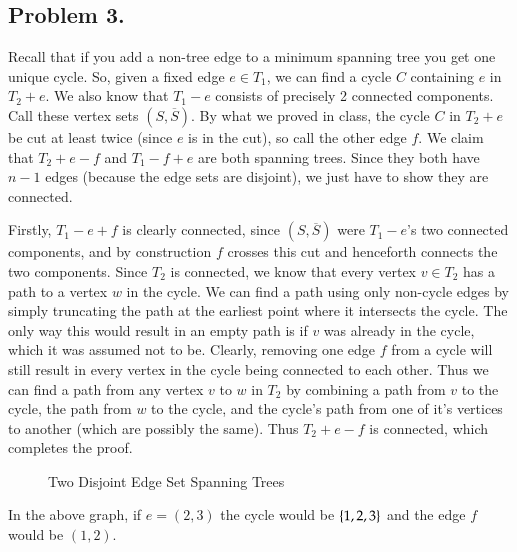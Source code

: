 \documentclass[12pt]{article}
\theoremstyle{definitionstyle}
\newcommand{\SET}[1]{\Set{\mskip-\medmuskip #1 \mskip-\medmuskip}}
\begin{document}
    \subsection*{Problem 3.}
    Recall that if you add a non-tree edge to a minimum spanning tree you get one unique cycle. So, given a fixed edge $e \in T_1$, we can find a cycle $C$ containing $e$ in $T_2 + e$. We also know that $T_1 - e$ consists of precisely 2 connected components. Call these vertex sets $(S, \overline S)$. By what we proved in class, the cycle $C$ in $T_2 + e$ be cut at least twice (since $e$ is in the cut), so call the other edge $f$. We claim that $T_2 + e - f$ and $T_1 - f + e$ are both spanning trees. Since they both have $n-1$ edges (because the edge sets are disjoint), we just have to show they are connected. 
    
    Firstly, $T_1-e+f$ is clearly connected, since $(S, \overline S)$ were $T_1 - e$'s two connected components, and by construction $f$ crosses this cut and henceforth connects the two components. Since $T_2$ is connected, we know that every vertex $v \in T_2$ has a path to a vertex $w$ in the cycle. We can find a path using only non-cycle edges by simply truncating the path at the earliest point where it intersects the cycle. The only way this would result in an empty path is if $v$ was already in the cycle, which it was assumed not to be. Clearly, removing one edge $f$ from a cycle will still result in every vertex in the cycle being connected to each other. Thus we can find a path from any vertex $v$ to $w$ in $T_2$ by combining a path from $v$ to the cycle, the path from $w$ to the cycle, and the cycle's path from one of it's vertices to another (which are possibly the same). Thus $T_2 + e - f$ is connected, which completes the proof.
    \begin{figure}[H]
        \centering
        \caption{Two Disjoint Edge Set Spanning Trees}
    \end{figure}
    In the above graph, if $e = (2,3)$ the cycle would be $\SET{1, 2, 3}$ and the edge $f$ would be $(1, 2)$.
\end{document}
